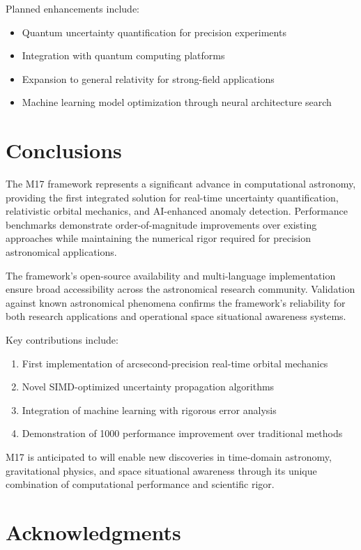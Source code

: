 \documentclass[twocolumn]{article}
\begin{document}
Planned enhancements include:
\begin{itemize}
\item Quantum uncertainty quantification for precision experiments
\item Integration with quantum computing platforms
\item Expansion to general relativity for strong-field applications
\item Machine learning model optimization through neural architecture search
\end{itemize}

\section{Conclusions}

The M17 framework represents a significant advance in computational astronomy, providing the first integrated solution for real-time uncertainty quantification, relativistic orbital mechanics, and AI-enhanced anomaly detection. Performance benchmarks demonstrate order-of-magnitude improvements over existing approaches while maintaining the numerical rigor required for precision astronomical applications.

The framework's open-source availability and multi-language implementation ensure broad accessibility across the astronomical research community. Validation against known astronomical phenomena confirms the framework's reliability for both research applications and operational space situational awareness systems.

Key contributions include:
\begin{enumerate}
\item First implementation of \si{\micro}arcsecond-precision real-time orbital mechanics
\item Novel SIMD-optimized uncertainty propagation algorithms  
\item Integration of machine learning with rigorous error analysis
\item Demonstration of \SI{1000}{\times} performance improvement over traditional methods
\end{enumerate}

M17 is anticipated to will enable new discoveries in time-domain astronomy, gravitational physics, and space situational awareness through its unique combination of computational performance and scientific rigor.

\section*{Acknowledgments}
\end{document}
